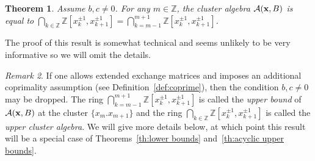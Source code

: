 \documentclass{amsart}
\newtheorem{theorem}{Theorem}[section]
\theoremstyle{definition}
\theoremstyle{remark}
\newtheorem{remark}[theorem]{Remark}
\numberwithin{equation}{section}
\newcommand{\cA}{{\mathcal{A}}}
\newcommand{\bx}{{\bf x}}
\newcommand{\ZZ}{{\mathbb{Z}}}
\begin{document}
  \begin{theorem}
    Assume $b,c\ne0$.  For any $m\in\ZZ$, the cluster algebra $\cA(\bx,B)$ is equal to $\bigcap_{k\in\ZZ}\ZZ[x_k^{\pm1},x_{k+1}^{\pm1}]=\bigcap_{k=m-1}^{m+1}\ZZ[x_k^{\pm1},x_{k+1}^{\pm1}]$.
  \end{theorem}
  The proof of this result is somewhat technical and seems unlikely to be very informative so we will omit the details.
  \begin{remark}
    If one allows extended exchange matrices and imposes an additional coprimality assumption (see Definition~\ref{def:coprime}), then the condition $b,c\ne0$ may be dropped.  The ring $\bigcap_{k=m-1}^{m+1}\ZZ[x_k^{\pm1},x_{k+1}^{\pm1}]$ is called the \emph{upper bound} of $\cA(\bx,B)$ at the cluster $\{x_m.x_{m+1}\}$ and the ring $\bigcap_{k\in\ZZ}\ZZ[x_k^{\pm1},x_{k+1}^{\pm1}]$ is called the \emph{upper cluster algebra}.  We will give more details below, at which point this result will be a special case of Theorems~\ref{th:lower bounds} and~\ref{th:acyclic upper bounds}.
  \end{remark}
\end{document}
